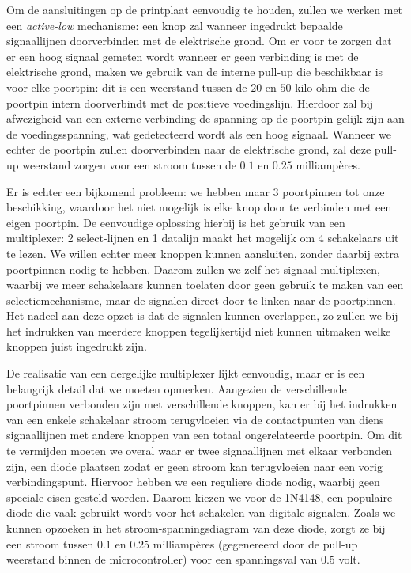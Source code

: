 Om de aansluitingen op de printplaat eenvoudig te houden, zullen we werken met een \emph{active-low} mechanisme: een knop zal wanneer ingedrukt bepaalde signaallijnen doorverbinden met de elektrische grond. Om er voor te zorgen dat er een hoog signaal gemeten wordt wanneer er geen verbinding is met de elektrische grond, maken we gebruik van de interne pull-up die beschikbaar is voor elke poortpin: dit is een weerstand tussen de $20$ en $50$ kilo-ohm die de poortpin intern doorverbindt met de positieve voedingslijn. Hierdoor zal bij afwezigheid van een externe verbinding de spanning op de poortpin gelijk zijn aan de voedingsspanning, wat gedetecteerd wordt als een hoog signaal. Wanneer we echter de poortpin zullen doorverbinden naar de elektrische grond, zal deze pull-up weerstand zorgen voor een stroom tussen de $0.1$ en $0.25$ milliampères.

Er is echter een bijkomend probleem: we hebben maar 3 poortpinnen tot onze beschikking, waardoor het niet mogelijk is elke knop door te verbinden met een eigen poortpin. De eenvoudige oplossing hierbij is het gebruik van een multiplexer: 2 select-lijnen en 1 datalijn maakt het mogelijk om 4 schakelaars uit te lezen. We willen echter meer knoppen kunnen aansluiten, zonder daarbij extra poortpinnen nodig te hebben. Daarom zullen we zelf het signaal multiplexen, waarbij we meer schakelaars kunnen toelaten door geen gebruik te maken van een selectiemechanisme, maar de signalen direct door te linken naar de poortpinnen. Het nadeel aan deze opzet is dat de signalen kunnen overlappen, zo zullen we bij het indrukken van meerdere knoppen tegelijkertijd niet kunnen uitmaken welke knoppen juist ingedrukt zijn.

De realisatie van een dergelijke multiplexer lijkt eenvoudig, maar er is een belangrijk detail dat we moeten opmerken. Aangezien de verschillende poortpinnen verbonden zijn met verschillende knoppen, kan er bij het indrukken van een enkele schakelaar stroom terugvloeien via de contactpunten van diens signaallijnen met andere knoppen van een totaal ongerelateerde poortpin. Om dit te vermijden moeten we overal waar er twee signaallijnen met elkaar verbonden zijn, een diode plaatsen zodat er geen stroom kan terugvloeien naar een vorig verbindingspunt. Hiervoor hebben we een reguliere diode nodig, waarbij geen speciale eisen gesteld worden. Daarom kiezen we voor de 1N4148, een populaire diode die vaak gebruikt wordt voor het schakelen van digitale signalen. Zoals we kunnen opzoeken in het stroom-spanningsdiagram van deze diode, zorgt ze bij een stroom tussen $0.1$ en $0.25$ milliampères (gegenereerd door de pull-up weerstand binnen de microcontroller) voor een spanningsval van $0.5$ volt.

